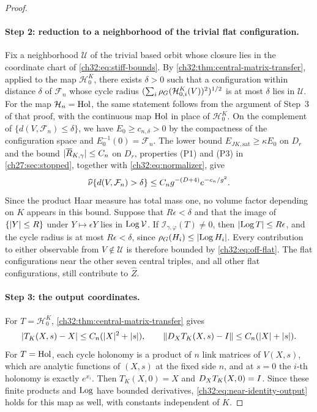 \begin{proof}
\paragraph{Step 2: reduction to a neighborhood of the trivial flat configuration.}
Fix a neighborhood $\mathcal U$ of the trivial based orbit whose closure lies in the coordinate chart of \eqref{ch32:eq:stiff-bounds}. By \cref{ch32:thm:central-matrix-transfer}, applied to the map $\mathcal H^K_0$, there exists $\delta>0$ such that a configuration within distance $\delta$ of $\mathcal F_n$ whose cycle radius $(\sum_i\rho_G(\mathcal H^K_{0,i}(V))^2)^{1/2}$ is at most $\delta$ lies in $\mathcal U$. For the map $\mathcal H_n=\operatorname{Hol}$, the same statement follows from the argument of Step~3 of that proof, with the continuous map $\operatorname{Hol}$ in place of $\mathcal H^K_0$. On the complement of $\{d(V,\mathcal F_n)\le\delta\}$, we have $E_0\ge c_{n,\delta}>0$ by the compactness of the configuration space and $E_0^{-1}(0)=\mathcal F_n$. The lower bound $E_{JK,\mathrm{sat}}\ge\kappa E_0$ on $D_r$ and the bound $\lvert \overline R_{K,\gamma}\rvert\le C_n$ on $D_r$, properties (P1) and (P3) in \cref{ch27:sec:stopped}, together with \eqref{ch32:eq:normalizer}, give
\begin{equation}\label{ch32:eq:off-flat}
 \widehat\nu\{d(V,\mathcal F_n)>\delta\}\le C_ng^{-(D+4)}e^{-c_n/g^2}.
\end{equation}
Since the product Haar measure has total mass one, no volume factor depending on $K$ appears in this bound. Suppose that $R\epsilon<\delta$ and that the image of $\{\lvert Y\rvert\le R\}$ under $Y\mapsto\epsilon Y$ lies in $\operatorname{Log}\mathcal V$. If $\mathcal I_{\gamma,\varphi}(T)\ne0$, then $\lvert \operatorname{Log} T\rvert\le R\epsilon$, and the cycle radius is at most $R\epsilon<\delta$, since $\rho_G(H_i)\le\lvert \operatorname{Log} H_i\rvert$. Every contribution to either observable from $V\notin\mathcal U$ is therefore bounded by \eqref{ch32:eq:off-flat}. The flat configurations near the other seven central triples, and all other flat configurations, still contribute to $\widehat Z$.

\paragraph{Step 3: the output coordinates.}
For $T=\mathcal H^K_0$, \cref{ch32:thm:central-matrix-transfer} gives
\begin{equation}\label{ch32:eq:near-identity-output}
 \lvert T_K(X,s)-X\rvert\le C_n(\lvert X\rvert^2+\lvert s\rvert),\qquad\lVert D_XT_K(X,s)-I\rVert\le C_n(\lvert X\rvert+\lvert s\rvert).
\end{equation}
For $T=\operatorname{Hol}$, each cycle holonomy is a product of $n$ link matrices of $V(X,s)$, which are analytic functions of $(X,s)$ at the fixed side $n$, and at $s=0$ the $i$-th holonomy is exactly $e^{x_i}$. Then $T_K(X,0)=X$ and $D_XT_K(X,0)=I$. Since these finite products and $\operatorname{Log}$ have bounded derivatives, \eqref{ch32:eq:near-identity-output} holds for this map as well, with constants independent of $K$.


\end{proof}

